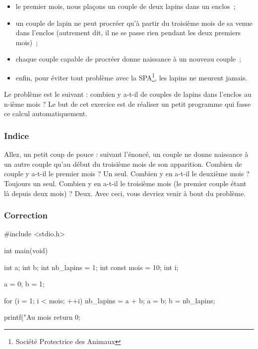 \begin{itemize}
\item
  le premier mois, nous plaçons un couple de deux lapins dans un enclos~;
\item
  un couple de lapin ne peut procréer qu'à partir du troisième mois de
  sa venue dans l'enclos (autrement dit, il ne se passe rien pendant les
  deux premiers mois)~;
\item
  chaque couple capable de procréer donne naissance à un nouveau couple~;
\item
  enfin, pour éviter tout problème avec la SPA\footnote{\footnotesize{
  Société Protectrice des Animaux}}, les lapins ne meurent jamais.
\end{itemize}

Le problème est le suivant : combien y a-t-il de couples de lapins dans
l'enclos au n-ième mois ? Le but de cet exercice est de réaliser un
petit programme qui fasse ce calcul automatiquement.

\subsubsection*{Indice}
\label{indice-2}

\begin{secretbox}
  Allez, un petit coup de pouce : suivant
l'énoncé, un couple ne donne naissance à un autre couple qu'au début du
troisième mois de son apparition. Combien de couple y a-t-il le premier
mois ? Un seul. Combien y en a-t-il le deuxième mois ? Toujours un seul.
Combien y en a-t-il le troisième mois (le premier couple étant là depuis
deux mois) ? Deux. Avec ceci, vous devriez venir à bout du problème.
\end{secretbox}


\subsubsection*{Correction}
\label{correction-6}

\begin{C}
 #include <stdio.h>


int main(void)
{
   int a;
   int b;
   int nb_lapins = 1;
   int const mois = 10;
   int i;

   a = 0;
   b = 1;

   for (i = 1; i < mois; ++i)
   {
       nb_lapins = a + b;
       a = b;
       b = nb_lapins;
   }

   printf("Au mois %
   return 0;  
}
\end{C}

